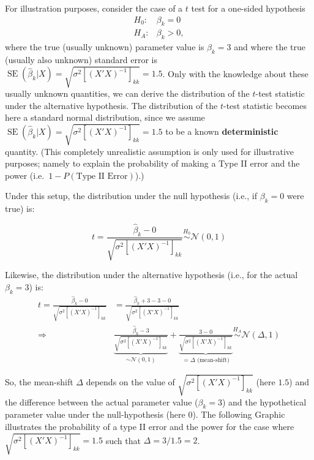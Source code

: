 \documentclass[
  letterpaper,
  DIV=11,
  numbers=noendperiod]{scrreprt}
\theoremstyle{definition}
\theoremstyle{plain}
\theoremstyle{plain}
\theoremstyle{remark}
\begin{document}
For illustration purposes, consider the case of a \(t\) test for a
one-sided hypothesis \begin{equation*}
\begin{array}{ll}
H_0:  & \beta_k=0 \\
H_A:  & \beta_k>0,
\end{array}
\end{equation*} where the true (usually unknown) parameter value is
\(\beta_k=3\) and where the true (usually also unknown) standard error
is
\(\operatorname{SE}(\hat\beta_k|X)=\sqrt{\sigma^2[(X'X)^{-1}]_{kk}}=1.5\).
Only with the knowledge about these usually unknown quantities, we can
derive the distribution of the \(t\)-test statistic under the
alternative hypothesis. The distribution of the \(t\)-test statistic
becomes here a standard normal distribution, since we assume
\(\operatorname{SE}(\hat\beta_k|X)=\sqrt{\sigma^2[(X'X)^{-1}]_{kk}}=1.5\)
to be a known \textbf{deterministic} quantity. (This completely
unrealistic assumption is only used for illustrative purposes; namely to
explain the probability of making a Type II error and the power
(i.e.~\(1-P(\text{Type II Error})\)).)

Under this setup, the distribution under the null hypothesis (i.e., if
\(\beta_k=0\) were true) is:

\[
t=\frac{\hat\beta_k-0}{\sqrt{\sigma^2[(X'X)^{-1}]_{kk}}}\overset{H_0}{\sim}\mathcal{N}(0,1)
\]

Likewise, the distribution under the alternative hypothesis (i.e., for
the actual \(\beta_k=3\)) is: \begin{align*}
t=\frac{\hat\beta_k-0}{\sqrt{\sigma^2[(X'X)^{-1}]_{kk}}}
&=\frac{\hat\beta_k+3-3-0}{\sqrt{\sigma^2[(X'X)^{-1}]_{kk}}}\\[2ex]
\Rightarrow\quad&\underbrace{\frac{\hat\beta_k-3}{\sqrt{\sigma^2[(X'X)^{-1}]_{kk}}}}_{\sim \mathcal{N}(0,1)}+\underbrace{\frac{3-0}{\sqrt{\sigma^2[(X'X)^{-1}]_{kk}}}}_{=\Delta\text{ (mean-shift)}}\overset{H_A}{\sim}\mathcal{N}(\Delta,1)
\end{align*}

So, the mean-shift \(\Delta\) depends on the value of
\(\sqrt{\sigma^2[(X'X)^{-1}]_{kk}}\) (here \(1.5\)) and the difference
between the actual parameter value (\(\beta_k=3\)) and the hypothetical
parameter value under the null-hypothesis (here \(0\)). The following
Graphic illustrates the probability of a type II error and the power for
the case where \(\sqrt{\sigma^2[(X'X)^{-1}]_{kk}}=1.5\) such that
\(\Delta=3/1.5=2\).
\end{document}
